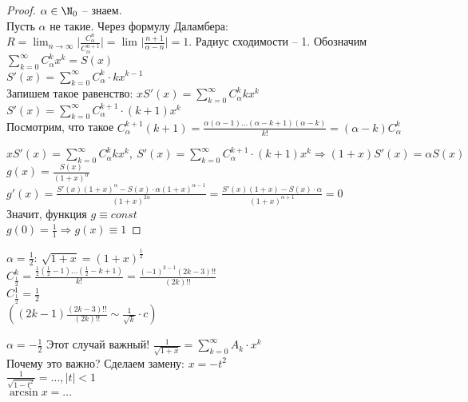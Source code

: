 \begin{proof}
    $\alpha \in \N_0$ -- знаем.\\
    Пусть $\alpha$ не такие. Через формулу Даламбера: $\displaystyle R = \lim_{n \to \infty} \Bigg|\frac{C_{\alpha}^n}{C_{\alpha}^{n+1}}\Bigg| = \lim_{} \Bigg|\frac{n+1}{\alpha - n}\Bigg| = 1$.
    Радиус сходимости -- 1. 
    Обозначим $\sum_{k=0}^{\infty} C_{\alpha}^k x^k = S(x)$\\
    $S'(x) = \sum_{k=0}^{\infty} C_{\alpha}^{k} \cdot kx^{k-1}$\\
    Запишем такое равенство: $xS'(x) = \sum_{k=0}^{\infty} C_{\alpha}^k k x^k$\\
    $S'(x) = \sum_{k=0}^{\infty} C_{\alpha}^{k+1} \cdot (k+1) x^k$\\
    Посмотрим, что такое $C_{\alpha}^{k+1} (k+1) = \frac{\alpha (\alpha-1)...(\alpha-k+1)(\alpha-k)}{k!}  = (\alpha - k) C_{\alpha}^k$

    $xS'(x) = \sum_{k=0}^{\infty} C_{\alpha}^k k x^k, \ S'(x) = \sum_{k=0}^{\infty} C_{\alpha}^{k+1} \cdot (k+1) x^k \Rightarrow (1+x)S'(x) = \alpha S(x)$\\
    $g(x) = \frac{S(x)}{(1+x)^{\alpha}}$\\
    $g'(x) = \frac{S'(x)(1+x)^{\alpha} - S(x) \cdot \alpha(1+x)^{\alpha - 1}}{(1+x)^{2\alpha}} = \frac{S'(x)(1+x) - S(x) \cdot \alpha}{(1+x)^{\alpha+1}} = 0$\\
    Значит, функция $g \equiv const$\\
    $g(0) = \frac{1}{1} \Rightarrow g(x) \equiv 1$
\end{proof}

\begin{Example}
    $\alpha = \frac{1}{2}: \ \sqrt{1+x} = (1+x)^{\frac{1}{2}}$\\
    $C_{\frac{1}{2}}^k = \frac{\frac{1}{2} (\frac{1}{2}-1)...(\frac{1}{2}-k+1)}{k!} = \frac{(-1)^{k-1}(2k-3)!!}{(2k)!!}$\\
    $C_{\frac{1}{2}}^1 = \frac{1}{2}$\\
    $\left((2k-1)\frac{(2k-3)!!}{(2k)!!} \sim \frac{1}{\sqrt{k}} \cdot c\right)$
\end{Example}

\begin{Ex}
    $\alpha = - \frac{1}{2}$
    Этот случай важный! $\frac{1}{\sqrt{1+x}} = \sum_{k=0}^{\infty} A_k \cdot x^k$\\
    Почему это важно? Сделаем замену: $x = - t^2$\\
    $\frac{1}{\sqrt{1-t^2}} = ..., |t| < 1$\\
    $\arcsin x = ...$
\end{Ex}

